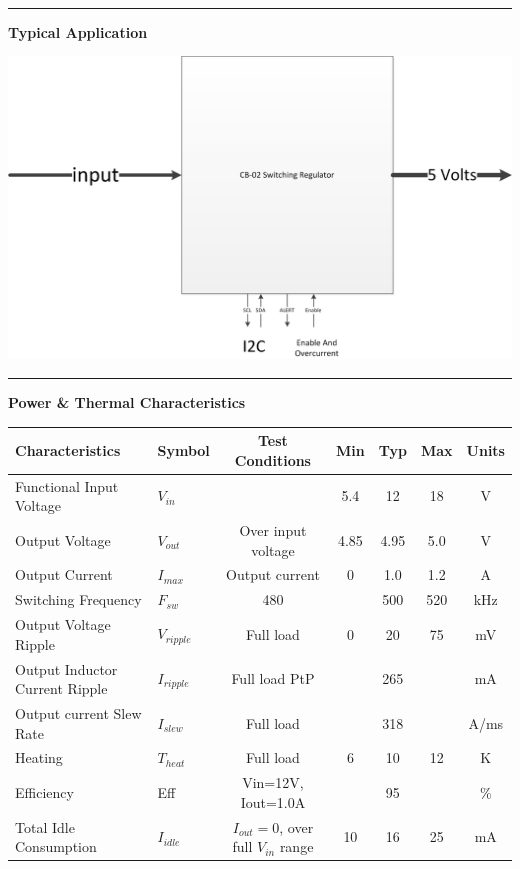 \documentclass{article}
\begin{document}
{\begin{minipage}[t]{0.5\linewidth}
\end{minipage}
} %
\\
\hspace{0.3in}
\hrule
\hspace{0.3in}
\begin{center} 
\large{\textbf{Typical Application}}
\end{center}
\begin{center}
\includegraphics[width=6in]{CB02_block.png}
\end{center}
\hrule
\newpage
\large{\textbf{Power \& Thermal Characteristics}} \\
\begin{center}
\begin{tabular}{|l | l |c| c|c|c|c|}
\hline
Characteristics & Symbol &Test Conditions & Min & Typ & Max & Units \\ \hline
Functional Input Voltage& $V_{in}$& & 5.4&12&18&V \\ \hline 
Output Voltage & $V_{out}$ & Over input voltage& 4.85 & 4.95 & 5.0 & V \\ \hline
Output Current & $I_{max}$ &Output current& 0 & 1.0& 1.2 &A \\ \hline
Switching Frequency& $F_{sw}$ &480 & &500&520& kHz \\ \hline
Output Voltage Ripple &$V_{ripple}$& Full load & 0& 20&75&mV \\ \hline
Output Inductor Current Ripple &$I_{ripple}$& Full load  PtP& &265&& mA \\\hline
Output current Slew Rate&$I_{slew}$& Full load&&318&& A/ms \\ \hline
Heating &$T_{heat}$ & Full load & 6&10&12& K \\ \hline
Efficiency & Eff &Vin=12V, Iout=1.0A& & 95 &  & \% \\\hline
Total Idle Consumption  & $I_{idle}$ & $I_{out}=0$, over full $V_{in}$ range & 10 & 16 & 25& mA \\ \hline 
\hline
\end{tabular}
\end{center}
\end{document}
